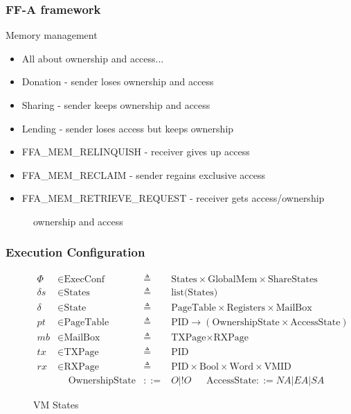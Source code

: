 \documentclass{beamer}
\newcommand*{\defined}{\triangleq}
\newcommand*{\maps}{\rightarrow}
\newcommand*{\derived}{::=}
\newcommand*{\CONF}{\text{ExecConf}}
\newcommand*{\STATE}{\text{State}}
\newcommand*{\MEM}{\text{GlobalMem}}
\newcommand*{\SSS}{\text{ShareStates}}
\newcommand*{\PID}{\text{PID}}
\newcommand*{\PT}{\text{PageTable}}
\newcommand*{\AS}{\text{AccessState}}
\newcommand*{\OS}{\text{OwnershipState}}
\newcommand*{\REGS}{\text{Registers}}
\newcommand*{\WORD}{\text{Word}}
\newcommand*{\VMID}{\text{VMID}}
\newcommand*{\MB}{\text{MailBox}}
\begin{document}
\begin{frame}
  \frametitle{FF-A framework}
  Memory management
  \begin{itemize}
    \item All about ownership and access...
    \item Donation - sender loses ownership and access
    \item Sharing - sender keeps ownership and access
    \item Lending - sender loses access but keeps ownership
    \item FFA\_MEM\_RELINQUISH - receiver gives up access
    \item FFA\_MEM\_RECLAIM - sender regains exclusive access
    \item FFA\_MEM\_RETRIEVE\_REQUEST - receiver gets access/ownership
  \end{itemize}
  \begin{figure}
    
        \caption{ownership and access}
      \end{figure}
    \end{frame}
\begin{frame}
  \frametitle{Execution Configuration}
\begin{figure}
  \begin{align*}
    \Phi &\in \CONF &\defined &\text{States} \times \MEM \times \SSS \\
    \delta s &\in \text{States} &\defined &\text{list(States)} \\
    \delta &\in \STATE &\defined &\PT \times \REGS \times \MB \\
    pt & \in \PT & \defined & \PID \maps (\OS \times \AS) \\
    mb & \in \MB &\defined &\text{TXPage} \times  \text{RXPage}\\
    tx & \in \text{TXPage} &\defined &\PID\\
    rx & \in \text{RXPage} &\defined &\PID \times \text{Bool} \times \WORD \times \VMID \\
      & \;\;\;\; \OS & \derived & O | !O  ~~~~~~~  \AS  \derived  NA | EA | SA
  \end{align*}
  \caption{VM States}
\end{figure}

\end{frame}
\end{document}
